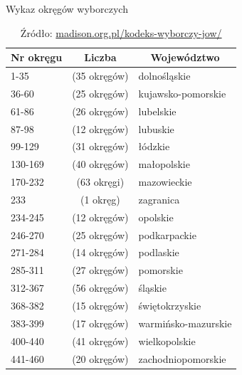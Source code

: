 \begin{table}[h!]
\caption{Wykaz okręgów wyborczych}
\centering
\begin{tabular}{|l|c|l|}
\hline
\multicolumn{1}{|c|}{\textbf{Nr okręgu}} & \textbf{Liczba} & \multicolumn{1}{c|}{\textbf{Województwo}} \\ \hline
1-35                                     & (35 okręgów)    &  dolnośląskie                         \\ \hline
36-60                                    & (25 okręgów)    &  kujawsko-pomorskie                   \\ \hline
61-86                                    & (26 okręgów)    &  lubelskie                            \\ \hline
87-98                                    & (12 okręgów)    &  lubuskie                             \\ \hline
99-129                                   & (31 okręgów)    &  łódzkie                              \\ \hline
130-169                                  & (40 okręgów)    &  małopolskie                          \\ \hline
170-232                                  & (63 okręgi)     &  mazowieckie                          \\ \hline
233                                      & (1 okręg)       & zagranica                                 \\ \hline
234-245                                  & (12 okręgów)    &  opolskie                             \\ \hline
246-270                                  & (25 okręgów)    &  podkarpackie                         \\ \hline
271-284                                  & (14 okręgów)    &  podlaskie                            \\ \hline
285-311                                  & (27 okręgów)    &  pomorskie                            \\ \hline
312-367                                  & (56 okręgów)    &  śląskie                              \\ \hline
368-382                                  & (15 okręgów)    &  świętokrzyskie                       \\ \hline
383-399                                  & (17 okręgów)    &  warmińsko-mazurskie                  \\ \hline
400-440                                  & (41 okręgów)    &  wielkopolskie                        \\ \hline
441-460                                  & (20 okręgów)    &  zachodniopomorskie                   \\ \hline
\end{tabular}
\caption*{Źródło: \url{madison.org.pl/kodeks-wyborczy-jow/}}
\end{table}

